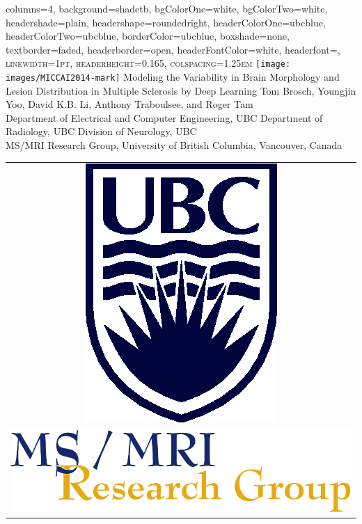 \documentclass[%
landscape,paperwidth=42in,paperheight=48in,%
margin=2cm,
fontscale=0.295
]{baposter}
\begin{document}
\begin{poster}{
  columns=4,
  background=shadetb,
  bgColorOne=white,
  bgColorTwo=white,
  headershade=plain,
  headershape=roundedright,
  headerColorOne=ubcblue,
  headerColorTwo=ubcblue,
  borderColor=ubcblue,
  boxshade=none,
  textborder=faded,
  headerborder=open,
  headerFontColor=white,
  headerfont=\scshape\Large,
  linewidth=1pt,
  headerheight=0.165\textwidth,
  colspacing=1.25em
}
{
\texttt{[image: images/MICCAI2014-mark]}
}
{
Modeling the Variability in Brain Morphology and Lesion Distribution in
Multiple Sclerosis by Deep Learning\vspace{0.5em}
}
{
Tom Brosch,
Youngjin Yoo,
David K.B. Li,
Anthony Traboulsee, and
Roger Tam\\[0.65ex]
\large {}Department of Electrical and Computer Engineering, UBC\quad
{}Department of Radiology, UBC\quad
{}Division of Neurology, UBC\\[0.65ex]
MS/MRI Research Group, University of British Columbia, Vancouver, Canada
}
{
\begin{tabular}{c}
\\
\includegraphics[height=0.07\textwidth]{images/s4b282c}\\
\addlinespace
\includegraphics[height=0.03\textwidth]{images/msmri_simple}
\end{tabular}
}


\end{poster}
\end{document}

